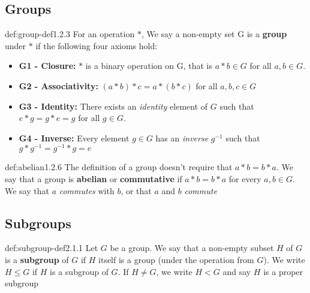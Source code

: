 \documentclass[landscape, 8pt]{extarticle}
\begin{document}
\begin{multicols}{3}

\subsection*{Groups}

\begin{dfn}[Groups]{def:group-def}{1.2.3}
    For an operation $\ast$, We say a non-empty set G is a \textbf{group} under $\ast$ if the following four axioms hold:
    \renewcommand\labelitemi{\tiny$\bullet$}
    \begin{itemize}
        \setlength\itemsep{0em}
        \item \textbf{G1 - Closure:} $\ast$ is a binary operation on G, that is $a\ast b \in G$ for all $a,b\in G$.
        \item \textbf{G2 - Associativity:} $(a\ast b) \ast c =a\ast(b\ast c)$ for all $a,b,c\in G$
        \item \textbf{G3 - Identity:} There exists an \textit{identity} element of $G$ such that $e\ast g = g\ast e = g$ for all $g\in G$.
        \item \textbf{G4 - Inverse:} Every element $g\in G$ has an \textit{inverse} $g^{-1}$ such that $g\ast g^{-1}=g^{-1}\ast g = e$
    \end{itemize}
\end{dfn}
\vspace{-5pt}

\begin{dfn}{def:abelian}{1.2.6}
    The definition of a group doesn't require that $a\ast b = b\ast a$.
    We say that a group is \textbf{abelian} or \textbf{commutative} if $a\ast b = b\ast a$ for every $a,b\in G$. We say that $a$ \textit{commutes} with $b$, or that $a$ and $b$ \textit{commute}
\end{dfn}
\vspace{-5pt}



\subsection*{Subgroups}

\begin{dfn}[Subgroups]{def:subgroup-def}{2.1.1}
    Let $G$ be a group. We say that a non-empty subset $H$ of $G$ is a \textbf{subgroup} of $G$ if $H$ itself is a group (under the operation from $G$). We write $H\le G$ if $H$ is a subgroup of $G$. If $H\ne G$, we write $H<G$ and say $H$ is a proper subgroup
\end{dfn}
\vspace{-5pt}


\end{multicols}
\end{document}

